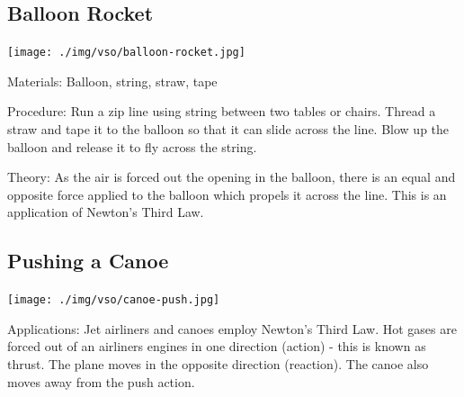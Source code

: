 \begin{multicols}{2}
\subsection{Balloon Rocket}

\begin{center}
\texttt{[image: ./img/vso/balloon-rocket.jpg]}
\end{center}

\begin{description*}
\item[Materials:]{Balloon, string, straw, tape}
\item[Procedure:]{Run a zip line using string between two tables or chairs. Thread a straw and tape it to the balloon so that it can slide across the line. Blow up the balloon and release it to fly across the string.}
\item[Theory:]{As the air is forced out the opening in the balloon, there is an equal and opposite force applied to the balloon which propels it across the line. This is an application of Newton's Third Law.}
\end{description*}

\subsection{Pushing a Canoe}

\begin{center}
\texttt{[image: ./img/vso/canoe-push.jpg]}
\end{center}

\begin{description*}
\item[Applications:]{Jet airliners and canoes employ Newton's Third Law. Hot gases are forced out of an airliners engines in one direction (action) - this is known as thrust. The plane moves in the opposite direction (reaction). The canoe also moves away from the push action.}
\end{description*}


\end{multicols}
